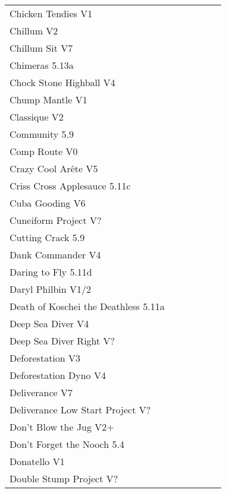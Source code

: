 \begin{flushleft}
\begin{center}
\begin{supertabular}{p{0.76\linewidth}p{0.08\linewidth}}
Chicken Tendies V1 & \pageref{rt:Chicken Tendies} \\
Chillum V2 & \pageref{rt:Chillum} \\
Chillum Sit V7 & \pageref{vr:Chillum Sit} \\
Chimeras 5.13a & \pageref{rt:Chimeras} \\
Chock Stone Highball V4 & \pageref{rt:Chock Stone Highball} \\
Chump Mantle V1 & \pageref{rt:Chump Mantle} \\
Classique V2 & \pageref{rt:Classique} \\
Community 5.9 & \pageref{rt:Community} \\
Comp Route V0 & \pageref{rt:Comp Route} \\
Crazy Cool Arête V5 & \pageref{rt:Crazy Cool Arête} \\
Criss Cross Applesauce 5.11c & \pageref{rt:Criss Cross Applesauce} \\
Cuba Gooding V6 & \pageref{rt:Cuba Gooding} \\
Cuneiform Project V? & \pageref{rt:Cuneiform Project} \\
Cutting Crack 5.9 & \pageref{rt:Cutting Crack} \\
Dank Commander V4 & \pageref{rt:Dank Commander} \\
Daring to Fly 5.11d & \pageref{rt:Daring to Fly} \\
Daryl Philbin V1/2 & \pageref{rt:Daryl Philbin} \\
Death of Koschei the Deathless 5.11a & \pageref{rt:Death of Koschei the Deathless} \\
Deep Sea Diver V4 & \pageref{rt:Deep Sea Diver} \\
Deep Sea Diver Right V? & \pageref{rt:DSD 4} \\
Deforestation V3 & \pageref{rt:Deforestation} \\
Deforestation Dyno V4 & \pageref{vr:Deforestation Dyno} \\
Deliverance V7 & \pageref{rt:Deliverance} \\
Deliverance Low Start Project V? & \pageref{vr:Deliverance Low} \\
Don't Blow the Jug V2+ & \pageref{rt:Don't Blow the Jug} \\
Don't Forget the Nooch 5.4 & \pageref{rt:Don't Forget the Nooch} \\
Donatello V1 & \pageref{rt:Donatello} \\
Double Stump Project V? & \pageref{rt:Double Stump Project} \\

\end{supertabular}
\end{center}
\end{flushleft}

